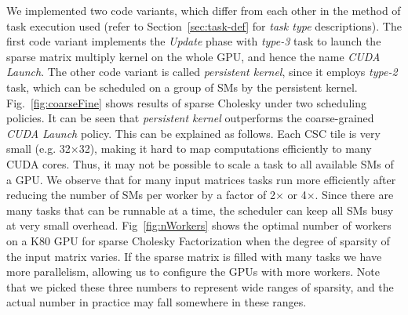 We implemented two code variants, which differ from each other in the method of task execution used (refer to Section~\ref{sec:task-def} for {\em task type} descriptions).
The first code variant implements the {\em Update} phase with {\em type-3} task to launch the sparse matrix multiply kernel on the whole GPU, and hence the name {\em CUDA Launch}.
The other code variant is called {\em persistent kernel}, since it employs {\em type-2} task, which can be scheduled on a group of SMs by the persistent kernel.
Fig.~\ref{fig:coarseFine} shows results of sparse Cholesky under two scheduling policies.
It can be seen that {\em persistent kernel} outperforms the coarse-grained {\em CUDA Launch} policy.
This can be explained as follows.
Each CSC tile is very small (e.g. 32$\times$32), making it hard to map computations efficiently to many CUDA cores.
Thus, it may not be possible to scale a task to all available SMs of a GPU.
We observe that for many input matrices tasks run more efficiently after reducing the number of SMs per worker by a factor of 2$\times$ or 4$\times$.
Since there are many tasks that can be runnable at a time, the scheduler can keep all SMs busy at very small overhead.
Fig~\ref{fig:nWorkers} shows the optimal number of workers on a K80 GPU for sparse Cholesky Factorization when the degree of sparsity of the input matrix varies.
If the sparse matrix is filled with many tasks we have more parallelism, allowing us to configure the GPUs with more workers.
Note that we picked these three numbers to represent wide ranges of sparsity, and the actual number in practice may fall somewhere in these ranges. 


